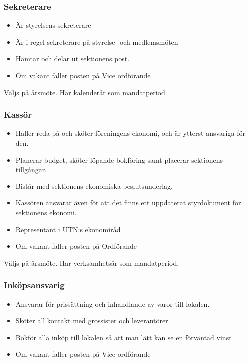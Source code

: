 \documentclass{../resources/dgovdoc}
\begin{document}
\subsubsection{Sekreterare}

\begin{itemize}
\item Är styrelsens sekreterare
\item Är i regel sekreterare på styrelse- och medlemsmöten
\item Hämtar och delar ut sektionens post.
\item Om vakant faller posten på Vice ordförande
\end{itemize}
Väljs på årsmöte. Har kalenderår som mandatperiod. 

\subsubsection{Kassör}

\begin{itemize}
\item Håller reda på och sköter föreningens ekonomi, och är ytterst ansvariga för den. 
\item Planerar budget, sköter löpande bokföring samt placerar sektionens tillgångar. 
\item Bistår med sektionens ekonomiska beslutsunderlag. 
\item Kassören ansvarar även för att det finns ett uppdaterat styrdokument för sektionens ekonomi. 
\item Representant i UTN:s ekonomiråd
\item Om vakant faller posten på Ordförande
\end{itemize}
Väljs på årsmöte. Har verksamhetsår som mandatperiod. 

\subsubsection{Inköpsansvarig}

\begin{itemize}
\item Ansvarar för prissättning och inhandlande av varor till lokalen. 
\item Sköter all kontakt med grossister och leverantörer
\item Bokför alla inköp till lokalen så att man lätt kan se en förväntad vinst
\item Om vakant faller posten på Vice ordförande
\end{itemize}
\end{document}
